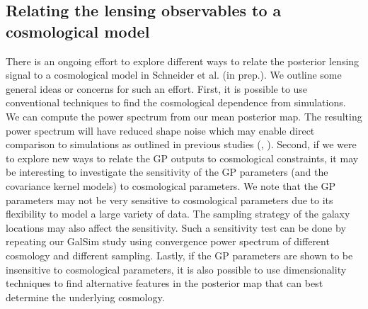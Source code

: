 \subsection{Relating the lensing observables to a cosmological model}
There is an ongoing effort to explore different ways to relate the posterior lensing signal 
to a cosmological model in Schneider et al. (in prep.). We outline some general
ideas or concerns for such an effort. First, it is possible to use conventional techniques 
 to find the cosmological dependence from simulations.  
We can compute the power spectrum from our mean posterior map. The resulting
power spectrum will have reduced shape noise which may enable direct comparison to
simulations as outlined in previous studies (\citealt{Jee2013a},
\citealt{Semboloni2007}). 
Second, if we were to explore new ways to relate the GP outputs to cosmological constraints,  
it may be interesting to investigate the sensitivity of the GP parameters (and
the covariance kernel models) to cosmological parameters. 
We note that the GP parameters may not be very sensitive to cosmological parameters
due to its flexibility to model a large variety of data. The sampling strategy of
the galaxy locations may also affect the sensitivity. Such a sensitivity test can be
done by repeating our {\sc GalSim} study using convergence power spectrum of different cosmology 
and different sampling. Lastly, if the GP parameters are shown to be
insensitive to cosmological parameters, it is also possible to use dimensionality
techniques to find alternative features in the posterior map that can best determine the
underlying cosmology. 


